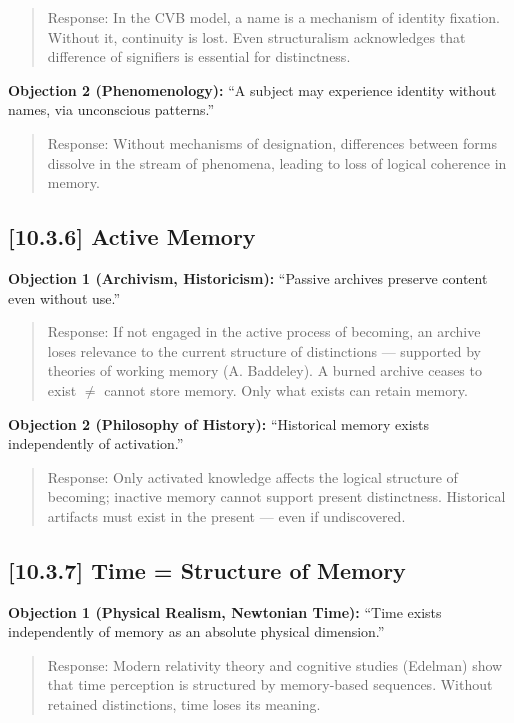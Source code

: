 \documentclass[12pt]{article}
\begin{document}
\begin{quote}
Response: In the CVB model, a name is a mechanism of identity fixation. Without it, continuity is lost. Even structuralism acknowledges that difference of signifiers is essential for distinctness.
\end{quote}

\textbf{Objection 2 (Phenomenology):} ``A subject may experience identity without names, via unconscious patterns.''

\begin{quote}
Response: Without mechanisms of designation, differences between forms dissolve in the stream of phenomena, leading to loss of logical coherence in memory.
\end{quote}

\bigskip
\subsection*{[10.3.6] Active Memory}

\textbf{Objection 1 (Archivism, Historicism):} ``Passive archives preserve content even without use.''

\begin{quote}
Response: If not engaged in the active process of becoming, an archive loses relevance to the current structure of distinctions — supported by theories of working memory (A. Baddeley). A burned archive ceases to exist $\neq$ cannot store memory. Only what exists can retain memory.
\end{quote}

\textbf{Objection 2 (Philosophy of History):} ``Historical memory exists independently of activation.''

\begin{quote}
Response: Only activated knowledge affects the logical structure of becoming; inactive memory cannot support present distinctness. Historical artifacts must exist in the present — even if undiscovered.
\end{quote}

\bigskip
\subsection*{[10.3.7] Time = Structure of Memory}

\textbf{Objection 1 (Physical Realism, Newtonian Time):} ``Time exists independently of memory as an absolute physical dimension.''

\begin{quote}
Response: Modern relativity theory and cognitive studies (Edelman) show that time perception is structured by memory-based sequences. Without retained distinctions, time loses its meaning.
\end{quote}
\end{document}
